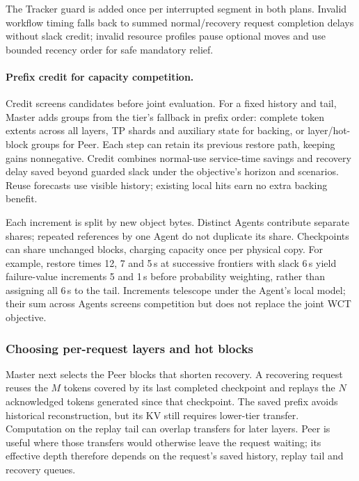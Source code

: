 The Tracker guard is added once per interrupted segment in both plans.
Invalid workflow timing falls back to summed normal/recovery request
completion delays without slack credit; invalid resource profiles pause
optional moves and use bounded recency order for safe mandatory relief.

\paragraph{Prefix credit for capacity competition.}
Credit screens candidates before joint evaluation. For a fixed history
and tail, Master adds groups from the tier's fallback in prefix order:
complete token extents across all layers, TP shards and auxiliary state
for backing, or layer/hot-block groups for Peer. Each step can retain
its previous restore path, keeping gains nonnegative. Credit combines
normal-use service-time savings and recovery delay saved beyond guarded
slack under the objective's horizon and scenarios. Reuse forecasts use
visible history; existing local hits earn no extra backing benefit.

Each increment is split by new object bytes. Distinct Agents contribute
separate shares; repeated references by one Agent do not duplicate its
share. Checkpoints can share unchanged blocks, charging capacity once per
physical copy. For example, restore times
12, 7 and 5\,s at successive frontiers with slack 6\,s yield failure-value
increments 5 and 1\,s before probability weighting, rather than assigning
all 6\,s to the tail. Increments telescope under the Agent's local model;
their sum across Agents screens competition but does not replace the
joint WCT objective.

\subsubsection{Choosing per-request layers and hot blocks}
\label{sec:sparse-placement}

Master next selects the Peer blocks that shorten recovery. A recovering
request reuses the $M$ tokens covered by its last completed checkpoint
and replays the $N$ acknowledged tokens generated since that checkpoint.
The saved prefix avoids historical reconstruction, but its KV still
requires lower-tier transfer. Computation on the replay tail can overlap
transfers for later layers. Peer is useful where those transfers would
otherwise leave the request waiting; its effective depth therefore
depends on the request's saved history, replay tail and recovery queues.

